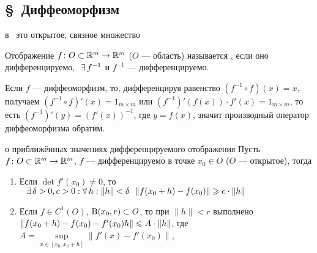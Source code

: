 \subsection*{\S\ Диффеоморфизм}
\begin{opr}
	 в \rmm\ это открытое, связное множество
\end{opr}

\begin{opr}
	Отображение $f \colon O \subset \mathbb R^m \to \mathbb R^m$ ($O$ --- область) называется , если оно дифференцируемо,$\E f^{-1}$ и $f^{-1}$ --- дифференцируемо.
\end{opr}

\begin{zam}[https://www.youtube.com/live/Ebv-BznzM6k?si=kWW6QO-IYsTzRTVU&t=354]
	Если $f$ --- диффеоморфизм, то, дифференцируя равенство $(f^{-1} \circ f)(x) = x$, получаем $(f^{-1} \circ f)'(x) = 1_{m \times m}$ или $(f^{-1})'(f(x)) \cdot f'(x) = 1_{m \times m}$, то есть $(f^{-1})'(y) = (f'(x))^{-1}$, где $y = f(x)$, значит производный оператор диффеоморфизма обратим.
\end{zam}

\begin{lem}[https://www.youtube.com/live/Ebv-BznzM6k?si=RireGv1RXr_0TJBB&t=652]{о приближённых значениях дифференцируемого отображения}
	Пусть $f \colon O \subset \mathbb R^m \to \mathbb R^m$, $f$ --- дифференцируемо в точке $x_0 \in O$ ($O$ --- открытое), тогда 
	\begin{enumerate}\makeatletter\renewcommand{\p@enumi}{\thelem.}\makeatother
	\item\label{лем.о приб. знач.}
	Если $\det f'(x_0) \ne 0$, то$\hspace{7pt plus 1pt minus 2pt} \exists \, \delta > 0, c >0 : \forall \, h : \|h\| < \delta\ \ \|f(x_0 + h) - f(x_0)\| \geqslant c \cdot \|h\|$
	
	\item\label{оц.б.м.} Если $f \in C^1(O)$, $\mathrm B(x_0, r) \subset O$, то при $\|h\| < r$ выполнено $\|f(x_0 + h) - f(x_0) - f'(x_0)h\| \leqslant A \cdot \|h\|$, где $A = \sup\limits_{x \in [x_0, x_0 + h]} \|f'(x) - f'(x_0)\|$,  
	\end{enumerate} 
\end{lem}


